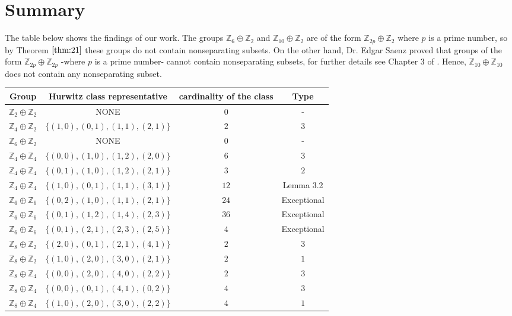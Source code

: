 \documentclass[article,dvisp]{amsart}
\def\Z{\mathbb{Z}}
\theoremstyle{definition}
\theoremstyle{remark}
\numberwithin{equation}{section}
\theoremstyle{lemma}
\begin{document}
\section{Summary}
The table below shows the findings of our work. The groups $\Z_{6}\oplus \Z_{2}$ and $\Z_{10}\oplus \Z_{2}$ are of the form $\Z_{2p}\oplus\Z_{2}$ where $p$ is a prime number, so by Theorem $\ref{thm:21}$ these groups do not contain nonseparating subsets. On the other hand, Dr. Edgar Saenz proved that groups of the form $\Z_{2p}\oplus\Z_{2p}$ -where $p$ is a prime number- cannot contain nonseparating subsets, for further details see Chapter 3 of \cite{S}. Hence, $\Z_{10}\oplus\Z_{10}$ does not contain any nonseparating subset.\\
\begin{center}
\begin{tabular}{|c|c|c|c|}
\hline
Group&Hurwitz class representative& cardinality of the class& Type\\
\hline
$\Z_{2}\oplus \Z_{2}$&NONE&0&-\\
\hline
$\Z_{4}\oplus \Z_{2}$&$\{(1,0),(0,1),(1,1),(2,1)\}$&$2$&$3$\\
\hline
$\Z_{6}\oplus \Z_{2}$&NONE&$0$&- \\
\hline
$\Z_{4}\oplus \Z_{4}$&$\{(0,0),(1,0),(1,2),(2,0)\}$&$6$&$3$ \\
\hline
$\Z_{4}\oplus \Z_{4}$&$\{(0,1),(1,0),(1,2),(2,1)\}$&$3$&$2$\\
\hline
$\Z_{4}\oplus \Z_{4}$&$\{(1,0),(0,1),(1,1),(3,1)\}$&$12$& Lemma 3.2\\
\hline
$\Z_{6}\oplus \Z_{6}$&$\{(0,2),(1,0),(1,1),(2,1)\}$&$24$& Exceptional\\
\hline
$\Z_{6}\oplus \Z_{6}$&$\{(0,1),(1,2),(1,4),(2,3)\}$&$36$& Exceptional\\
\hline
$\Z_{6}\oplus \Z_{6}$&$\{(0,1),(2,1),(2,3),(2,5)\}$&$4$& Exceptional\\
\hline
$\Z_{8}\oplus \Z_{2}$&$\{(2,0),(0,1),(2,1),(4,1)\}$&$2$&$3$\\
\hline
$\Z_{8}\oplus \Z_{2}$&$\{(1,0),(2,0),(3,0),(2,1)\}$&$2$&$1$\\
\hline
$\Z_{8}\oplus\Z_{4}$&$\{(0,0),(2,0),(4,0),(2,2)\}$&$2$&$3$\\
\hline
$\Z_{8}\oplus\Z_{4}$&$\{(0,0),(0,1),(4,1),(0,2)\}$&$4$&$3$\\
\hline
$\Z_{8}\oplus\Z_{4}$&$\{(1,0),(2,0),(3,0),(2,2)\}$&$4$&$1$\\
\hline

\end{tabular}
\end{center}
\end{document}
